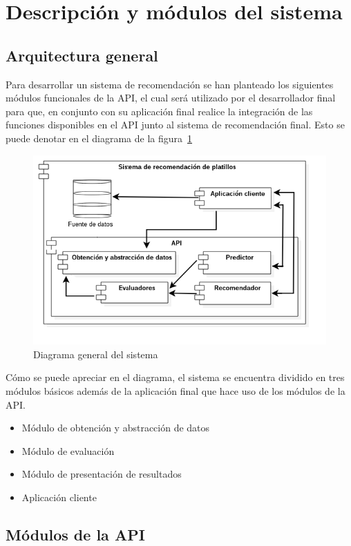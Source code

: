 \section {Descripción y módulos del sistema}

\subsection{Arquitectura general}
Para desarrollar un sistema de recomendación se han planteado los siguientes módulos funcionales de la API, el cual será utilizado por el desarrollador final para que, en conjunto con su aplicación final realice la integración de las funciones disponibles en el API junto al sistema de recomendación final. Esto se puede denotar en el diagrama de la figura~\ref{fig:architecture}

\begin{figure}[h!]
	\centering
	\includegraphics[width=16cm]{./images/architecture.png}
	\caption{Diagrama general del sistema}
	\label{fig:architecture}
\end{figure}

Cómo se puede apreciar en el diagrama, el sistema se encuentra dividido en tres módulos básicos además de la aplicación final que hace uso de los módulos de la API.
\begin{itemize}
	\item Módulo de obtención y abstracción de datos
	\item Módulo de evaluación
	\item Módulo de presentación de resultados
	\item Aplicación cliente
\end{itemize}

\subsection{Módulos de la API}
